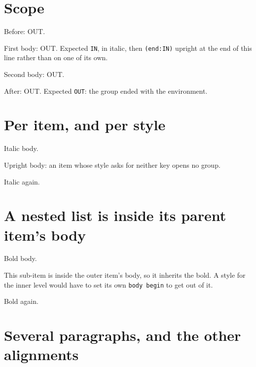 \documentclass{article}
\newcommand\probe{OUT}
\begin{document}
\section{Scope}

Before: \probe.
\begin{prop}[body begin = \renewcommand\probe{IN}\itshape,
             body end = \textup{(end:\probe)}]
  \item First body: \probe.  Expected \texttt{IN}, in italic, then
    \texttt{(end:IN)} upright at the end of this line rather than on one of
    its own.
  \item Second body: \probe.
\end{prop}
After: \probe.  Expected \texttt{OUT}: the group ended with the environment.

\section{Per item, and per style}

\begin{prop}
  \item[style=ital] Italic body.
  \item Upright body: an item whose style asks for neither key opens no group.
  \item[style=ital] Italic again.
\end{prop}

\section{A nested list is inside its parent item's body}

\begin{prop}[body begin = \bfseries]
  \item Bold body.
  \begin{prop}
    \item This sub-item is inside the outer item's body, so it inherits the
      bold.  A style for the inner level would have to set its own
      \texttt{body begin} to get out of it.
  \end{prop}
  \item Bold again.
\end{prop}

\section{Several paragraphs, and the other alignments}
\end{document}
